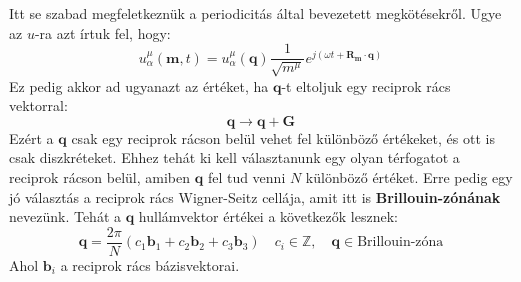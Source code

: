 \documentclass[../main.tex]{subfiles}
\begin{document}
Itt se szabad megfeletkeznük a periodicitás által bevezetett megkötésekről. Ugye az $u$-ra azt írtuk fel, hogy:
\begin{equation}
    u_\alpha^\mu (\mathbf{m}, t) = u_\alpha^\mu (\mathbf{q}) \frac{1}{\sqrt{m^\mu}} e^{j (\omega t + \mathbf{R}_\mathbf{m} \cdot \mathbf{q})}
\end{equation}
Ez pedig akkor ad ugyanazt az értéket, ha $\mathbf{q}$-t eltoljuk egy reciprok rács vektorral:
\begin{equation}
    \mathbf{q} \to \mathbf{q} + \mathbf{G}
\end{equation}
Ezért a $\mathbf{q}$ csak egy reciprok rácson belül vehet fel különböző értékeket, és ott is csak diszkréteket. Ehhez tehát ki kell választanunk egy olyan térfogatot a reciprok rácson belül, amiben $\mathbf{q}$ fel tud venni $N$ különböző értéket.
Erre pedig egy jó választás a reciprok rács Wigner-Seitz cellája, amit itt is \textbf{Brillouin-zónának} nevezünk. Tehát a $\mathbf{q}$ hullámvektor értékei a következők lesznek:
\begin{equation}
    \mathbf{q} = \frac{2 \pi}{N} (c_1 \mathbf{b}_1 + c_2 \mathbf{b}_2 + c_3 \mathbf{b}_3) \quad c_i \in \mathbb{Z}, \quad \mathbf{q} \in \text{Brillouin-zóna}
\end{equation}
Ahol $\mathbf{b}_i$ a reciprok rács bázisvektorai.
\end{document}

